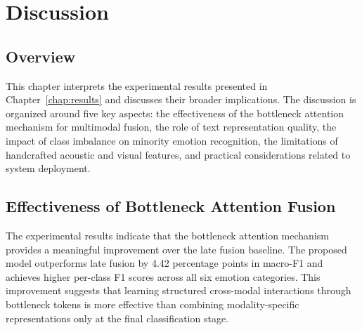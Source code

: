 
\chapter{Discussion}
\label{chap:discussion}

\setlength{\parskip}{1em}

\section{Overview}
This chapter interprets the experimental results presented in Chapter~\ref{chap:results} and discusses their broader implications. The discussion is organized around five key aspects: the effectiveness of the bottleneck attention mechanism for multimodal fusion, the role of text representation quality, the impact of class imbalance on minority emotion recognition, the limitations of handcrafted acoustic and visual features, and practical considerations related to system deployment.
\section{Effectiveness of Bottleneck Attention Fusion}
The experimental results indicate that the bottleneck attention mechanism provides a meaningful improvement over the late fusion baseline. The proposed model outperforms late fusion by 4.42 percentage points in macro-F1 and achieves higher per-class F1 scores across all six emotion categories. This improvement suggests that learning structured cross-modal interactions through bottleneck tokens is more effective than combining modality-specific representations only at the final classification stage.

